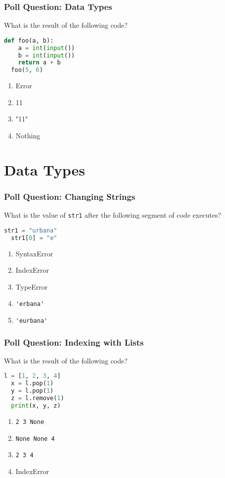 \documentclass[xcolor=table]{beamer}
\begin{document}
%
%
%
\begin{frame}[fragile]
  \frametitle{Poll Question: Data Types}
  What is the result of the following code?
  \begin{lstlisting}[language=Python, autogobble]
  def foo(a, b):
    a = int(input())
    b = int(input())
    return a + b
  foo(5, 6)
  \end{lstlisting}
  \vfill
  \begin{enumerate}[A]
    \item Error
    \item 11
    \item "11"
    \item Nothing
  \end{enumerate}
\end{frame}

\section{Data Types}

%
%
\begin{frame}[fragile]
  \frametitle{Poll Question: Changing Strings}
  What is the value of \lstinline|str1| after the following segment of code executes?
  \begin{lstlisting}[language=Python, autogobble] 
  str1 = "urbana"
  str1[0] = "e"
  \end{lstlisting}
  \vfill
  \begin{enumerate}[A] 
    \item SyntaxError
    \item IndexError
    \item TypeError
    \item \lstinline{'erbana'}
    \item \lstinline{'eurbana'}
  \end{enumerate}
\end{frame}

%
%
\begin{frame}[fragile]
  \frametitle{Poll Question: Indexing with Lists}
  What is the result of the following code?
  \begin{lstlisting}[language=Python, autogobble]
  l = [1, 2, 3, 4]
  x = l.pop(1)
  y = l.pop(1)
  z = l.remove(1)
  print(x, y, z)
  \end{lstlisting}
  \vfill
  \begin{enumerate}[A] 
    \item \lstinline|2 3 None|
    \item \lstinline|None None 4|
    \item \lstinline|2 3 4|
    \item IndexError
  \end{enumerate}
\end{frame}
\end{document}
